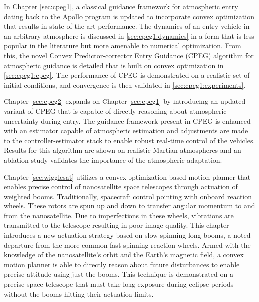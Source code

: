 
In Chapter \ref{sec:cpeg1}, a classical guidance framework for atmospheric entry dating back to the Apollo program is updated to incorporate convex optimization that results in state-of-the-art performance. 
The dynamics of an entry vehicle in an arbitrary atmosphere is discussed in \ref{sec:cpeg1:dynamics} in a form that is less popular in the literature but more amenable to numerical optimization.
From this, the novel Convex Predictor-corrector Entry Guidance (CPEG) algorithm for atmospheric guidance is detailed that is built on convex optimization in \ref{sec:cpeg1:cpeg}.
The performance of CPEG is demonstrated on a realistic set of initial conditions, and convergence is then validated in \ref{sec:cpeg1:experiments}. 

Chapter \ref{sec:cpeg2} expands on Chapter \ref{sec:cpeg1} by introducing an updated variant of CPEG that is capable of directly reasoning about atmospheric uncertainty during entry.
The guidance framework present in CPEG is enhanced with an estimator capable of atmospheric estimation and adjustments are made to the controller-estimator stack to enable robust real-time control of the vehicles.
Results for this algorithm are shown on realistic Martian atmospheres and an ablation study validates the importance of the atmospheric adaptation. 

Chapter \ref{sec:wigglesat} utilizes a convex optimization-based motion planner that enables precise control of nanosatellite space telescopes through actuation of weighted booms.
Traditionally, spacecraft control pointing with onboard reaction wheels. These rotors are spun up and down to transfer angular momentum to and from the nanosatellite.
Due to imperfections in these wheels, vibrations are transmitted to the telescope resulting in poor image quality.  
This chapter introduces a new actuation strategy based on slow-spinning long booms, a noted departure from the more common fast-spinning reaction wheels. Armed with the knowledge of the nanosatellite's orbit and the Earth's magnetic field, a convex motion planner is able to directly reason about future disturbances to enable precise attitude using just the booms. 
This technique is demonstrated on a precise space telescope that must take long exposure during eclipse periods without the booms hitting their actuation limits. 

